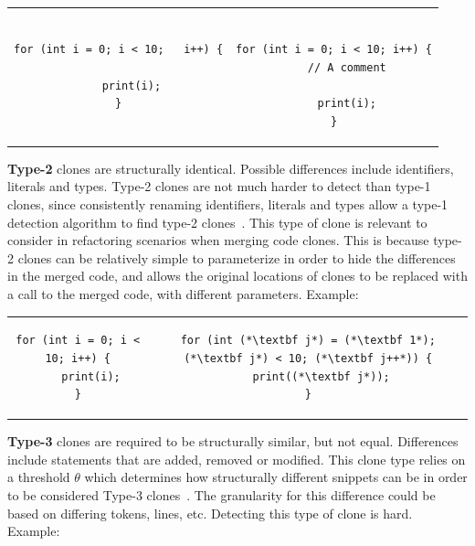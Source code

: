 \begin{tcolorbox}
	\begin{center}
		\begin{tabular}{c | c}
            \begin{lstlisting}
for (int i = 0; i < 10;   i++) {

    print(i);
}
        \end{lstlisting} &
			\begin{lstlisting}

for (int i = 0; i < 10; i++) {
    // A comment

    print(i);
}
        \end{lstlisting}
		\end{tabular}
	\end{center}
\end{tcolorbox}


\textbf{Type-2} clones are structurally identical. Possible differences include
identifiers, literals and types. Type-2 clones are not much harder to detect than type-1
clones, since consistently renaming identifiers, literals and types allow a type-1
detection algorithm to find type-2 clones~\cite{Zibran_real_time_search}. This type of
clone is relevant to consider in refactoring scenarios when merging code clones. This is
because type-2 clones can be relatively simple to parameterize in order to hide the
differences in the merged code, and allows the original locations of clones to be replaced
with a call to the merged code, with different parameters. Example:

\begin{center}
	\begin{tcolorbox}
		\begin{tabular}{c | c}
			\begin{lstlisting}
for (int i = 0; i < 10; i++) {
    print(i);
}
    \end{lstlisting} &
	\begin{lstlisting}
for (int (*\textbf j*) = (*\textbf 1*); (*\textbf j*) < 10; (*\textbf j++*)) {
    print((*\textbf j*));
}
    \end{lstlisting}
		\end{tabular}
	\end{tcolorbox}
\end{center}

\textbf{Type-3} clones are required to be structurally similar, but not equal. Differences
include statements that are added, removed or modified. This clone type relies on a
threshold $\theta$ which determines how structurally different snippets can be in order to
be considered Type-3 clones~\cite{Inoue_introduction_to_cc}. The granularity for this
difference could be based on differing tokens, lines, etc. Detecting this type of clone is
hard. Example:

